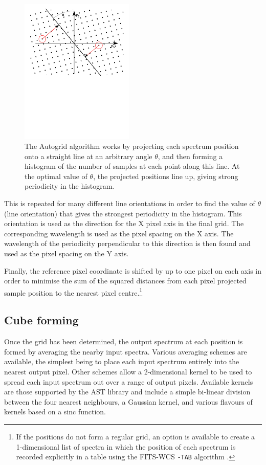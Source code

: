 \documentclass[final,authoryear,5p,times,twocolumn]{elsarticle}
\begin{document}
\begin{figure}
\includegraphics[width=0.48\textwidth]{autogrid}
\caption{The Autogrid algorithm works by projecting each spectrum
  position onto a straight line at an arbitrary angle $\theta$, and then
  forming a histogram of the number of samples at each point along
  this line. At the optimal value of $\theta$, the projected positions
  line up, giving strong periodicity in the histogram.}
\label{fig:autogrid}
\end{figure}

This is repeated for many different line orientations in order to find
the value of $\theta$ (line orientation) that gives the strongest
periodicity in the histogram. This orientation is used as the
direction for the X pixel axis in the final grid. The corresponding
wavelength is used as the pixel spacing on the X axis. The wavelength
of the periodicity perpendicular to this direction is then found and
used as the pixel spacing on the Y axis.

Finally, the reference pixel coordinate is shifted by up to one pixel
on each axis in order to minimise the sum of the squared distances
from each pixel projected sample position to the nearest pixel
centre.\footnote{If the positions do not form a regular grid, an option is
available to create a 1-dimensional list of spectra in which the
position of each spectrum is recorded explicitly in a table using
the FITS-WCS \texttt{-TAB} algorithm \citep{2006A&A...446..747G}.}

\subsection{Cube forming}

Once the grid has been determined, the output spectrum at each
position is formed by averaging the nearby input spectra. Various
averaging schemes are available, the simplest being to place each
input spectrum entirely into the nearest output pixel. Other schemes
allow a 2-dimensional kernel to be used to spread each input spectrum
out over a range of output pixels. Available kernels are those
supported by the AST library \citep{SUN211,2012ASPC..461..825B} and
include a simple bi-linear division between the four nearest
neighbours, a Gaussian kernel, and various flavours of kernels based
on a sinc function.
\end{document}
